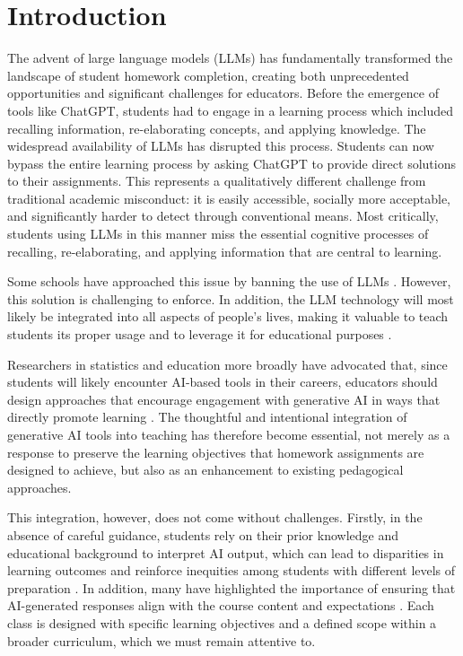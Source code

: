 \documentclass[
  12pt]{article}
\begin{document}
\vfill

\newpage
{} %

\section{Introduction}

The advent of large language models (LLMs) has fundamentally transformed the landscape of student homework completion, creating both unprecedented opportunities and significant challenges for educators.
Before the emergence of tools like ChatGPT, students had to engage in a learning process which included recalling information, re-elaborating concepts, and applying knowledge. 
The widespread availability of LLMs has disrupted this process.
Students can now bypass the entire learning process by asking ChatGPT to provide direct solutions to their assignments.
This represents a qualitatively different challenge from traditional academic misconduct: it is easily accessible, socially more acceptable, and significantly harder to detect through conventional means.
Most critically, students using LLMs in this manner miss the essential cognitive processes of recalling, re-elaborating, and applying information that are central to learning. 

Some schools have approached this issue by banning the use of LLMs \citep{walter-2024}.
However, this solution is challenging to enforce. In addition, the LLM technology will most likely be integrated into all aspects of people's lives, making it valuable to teach students its proper usage and to leverage it for educational purposes \citep{walter-2024}.

Researchers in statistics and education more broadly have advocated that, since students will likely encounter AI-based tools in their careers, educators should design approaches that encourage engagement with generative AI in ways that directly promote learning \citep{ellis-slade-2023}. The thoughtful and intentional integration of generative AI tools into teaching has therefore become essential, not merely as a response to preserve the learning objectives that homework assignments are designed to achieve, but also as an enhancement to existing pedagogical approaches.


This integration, however, does not come without challenges. Firstly, in the absence of careful guidance, students rely on their prior knowledge and educational background to interpret AI output, which can lead to disparities in learning outcomes and reinforce inequities among students with different levels of preparation \citep{wang-et-al-2025,baek-et-al-2024}. In addition, many have highlighted the importance of ensuring that AI-generated responses align with the course content and expectations \citep{hariyanti-et-al-2025}. Each class is designed with specific learning objectives and a defined scope within a broader curriculum, which we must remain attentive to.
\end{document}
